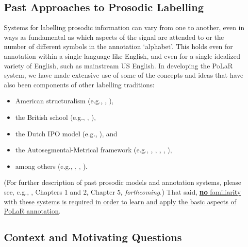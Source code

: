 \subsection{Past Approaches to Prosodic Labelling}\label{sec:past-approaches-to-prosodic-labelling}

Systems for labelling prosodic information can vary from one to another, even in ways as fundamental as which aspects of the signal are attended to or the number of different symbols in the annotation ‘alphabet’. This holds even for annotation within a single language like English, and even for a single idealized variety of English, such as mainstream US English. In developing the PoLaR system, we have made extensive use of some of the concepts and ideas that have also been components of other labelling traditions:

\begin{itemize}
\item American structuralism (e.g., \citealt{pike45}, \citealt{tragersmith51}),
\item the British school (e.g., \citealt{crystal69}, \citealt{oconnorarnold73}),
\item the Dutch IPO model (e.g., \citealt{t-hart-90}), and
\item the Autosegmental-Metrical framework (e.g., \citealt{pierrehumbert80}, \citealt{beckmanayers97}, \citealt{grabe-01}, \citealt{hualdeprieto16}, \citealt{dilleybreen18}),
\item among others (e.g., \citealt{hirst07}, \citealt{taylor98}, \citealt{xu12}).
\end{itemize}

(For further description of past prosodic models and annotation systems, please see, e.g., \citealt{roach94}, \citealt{ladd08} Chapters 1 and 2, \citealt{fery17} Chapter 5, \citeauthor{barnesshattuckhufnagel20} \textit{forthcoming}.) That said, \uline{\textbf{no} familiarity with these systems is required in order to learn and apply the basic aspects of PoLaR annotation}.

\subsection{Context and Motivating Questions}\label{sec:context-and-motivating-questions}

